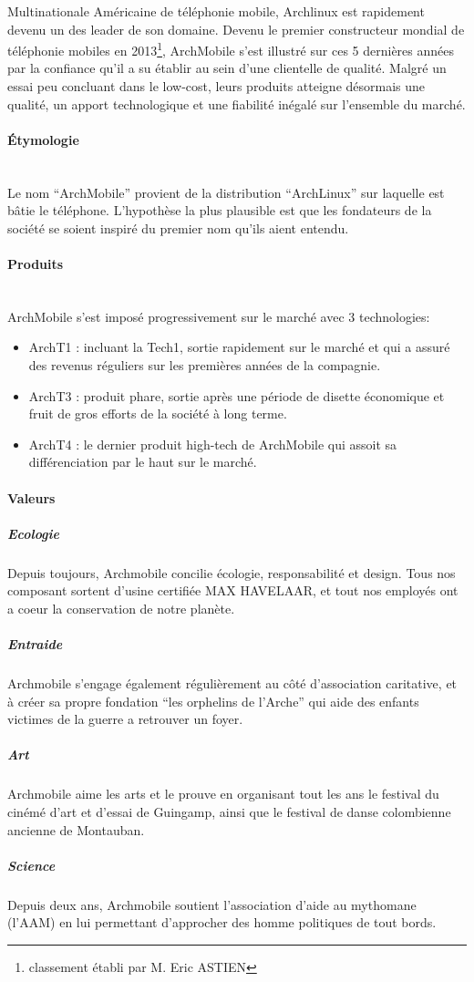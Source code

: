 Multinationale Américaine de téléphonie mobile, Archlinux 
est rapidement devenu un des leader de son domaine.
Devenu le premier constructeur mondial de téléphonie mobiles 
en 2013\footnote{classement établi par M. Eric ASTIEN},
ArchMobile s'est illustré sur ces 5 dernières années par
la confiance qu'il a su établir au sein d'une clientelle 
de qualité. Malgré un essai peu concluant dans le low-cost,
leurs produits atteigne désormais une qualité, un apport
technologique et une fiabilité inégalé sur l'ensemble du
marché.



\paragraph{\'Etymologie}~\\
Le nom ``ArchMobile'' provient de la distribution ``ArchLinux'' sur
laquelle est bâtie le téléphone. L'hypothèse la plus plausible est que
les fondateurs de la société se soient inspiré du premier nom qu'ils
aient entendu. 

\paragraph{Produits}~\\
ArchMobile s'est imposé progressivement sur le marché avec 3 technologies:
\begin{itemize}
\item ArchT1 : incluant la Tech1, sortie rapidement sur le marché et qui a assuré 
  des revenus réguliers sur les premières années de la compagnie.
\item ArchT3 : produit phare, sortie après une période de disette 
  économique et fruit de gros efforts de la société à long terme.
\item ArchT4 : le dernier produit high-tech de ArchMobile qui assoit
  sa différenciation par le haut sur le marché.
\end{itemize}

\paragraph{Valeurs}
\subparagraph{Ecologie}
Depuis toujours, Archmobile concilie écologie, responsabilité et
design. Tous nos composant sortent d'usine certifiée MAX HAVELAAR, et
tout nos employés ont a coeur la conservation de notre planète.
\subparagraph{Entraide}
Archmobile s'engage également régulièrement au côté d'association
caritative, et à créer sa propre fondation ``les orphelins de
l'Arche'' qui aide des enfants victimes de la guerre a retrouver un
foyer.
\subparagraph{Art}
Archmobile aime les arts et le prouve en organisant tout les ans le
festival du cinémé d'art et d'essai de Guingamp, ainsi que le festival
de danse colombienne ancienne de Montauban.
\subparagraph{Science}
Depuis deux ans, Archmobile soutient l'association d'aide au mythomane
(l'AAM) en lui permettant d'approcher des homme politiques de tout
bords.

